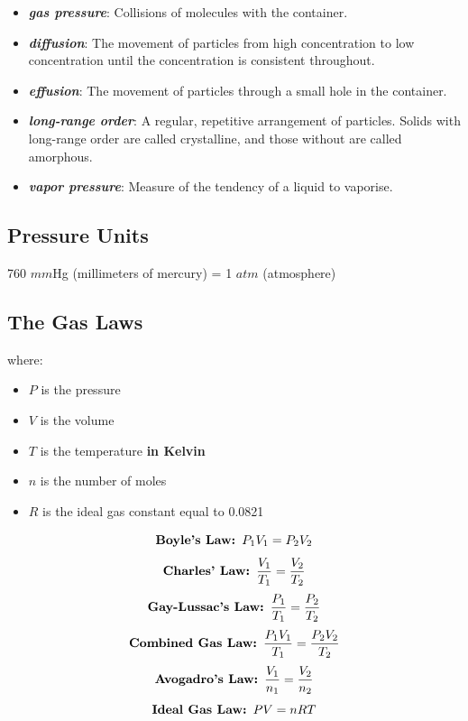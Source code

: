 \documentclass[a4paper, 12pt]{article}
\begin{document}
\begin{itemize}[leftmargin=*, nosep]
    \item \textbf{\textit{gas pressure}}: Collisions of molecules with the container.
    \item \textbf{\textit{diffusion}}: The movement of particles from high concentration to low concentration until the concentration is consistent throughout.
    \item \textbf{\textit{effusion}}: The movement of particles through a small hole in the container.
    \item \textbf{\textit{long-range order}}: A regular, repetitive arrangement of particles. Solids with long-range order are called crystalline, and those without are called amorphous.
    \item \textbf{\textit{vapor pressure}}: Measure of the tendency of a liquid to vaporise.
\end{itemize}

\subsection*{Pressure Units}
760 $mm$Hg (millimeters of mercury) = 1 $atm$ (atmosphere)

\subsection*{The Gas Laws}
where:

\begin{itemize}[leftmargin=*, nosep]
    \item $P$ is the pressure
    \item $V$ is the volume
    \item $T$ is the temperature \textbf{in Kelvin}
    \item $n$ is the number of moles
    \item $R$ is the ideal gas constant equal to 0.0821
\end{itemize}

\begin{equation}\label{boyle}
    \text{\textbf{Boyle's Law: }}P_1V_1 = P_2V_2
\end{equation}
\begin{equation}\label{charles}
    \text{\textbf{Charles' Law: }}\frac{V_1}{T_1} = \frac{V_2}{T_2}
\end{equation}
\begin{equation}\label{gaylussac}
    \text{\textbf{Gay-Lussac's Law: }}\frac{P_1}{T_1} = \frac{P_2}{T_2}
\end{equation}
\begin{equation}\label{combined}
    \text{\textbf{Combined Gas Law: }}\frac{P_1V_1}{T_1} = \frac{P_2V_2}{T_2}
\end{equation}
\begin{equation}\label{avogadro}
    \text{\textbf{Avogadro's Law: }}\frac{V_1}{n_1} = \frac{V_2}{n_2}
\end{equation}
\begin{equation}\label{ideal}
    \text{\textbf{Ideal Gas Law: }}PV = nRT
\end{equation}
\end{document}
